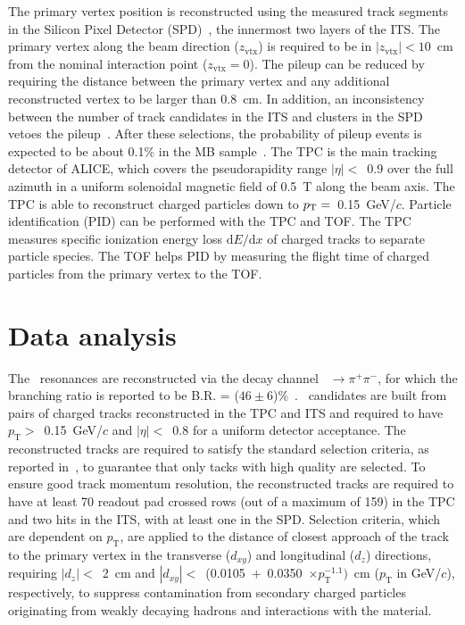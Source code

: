 The primary vertex position is reconstructed using the measured track segments in the Silicon Pixel Detector (SPD)~\cite{Santoro2009:ALICESPD}, the innermost two layers of the ITS. The primary vertex along the beam direction ($z_\mathrm{vtx}$) is required to be in $|z_\mathrm{vtx}|<10$~cm from the nominal interaction point ($z_\mathrm{vtx}=0$). The pileup can be reduced by requiring the distance between the primary vertex and any additional reconstructed vertex to be larger than 0.8~cm. In addition, an inconsistency between the number of track candidates in the ITS and clusters in the SPD vetoes the pileup~\cite{ALICE:2015olq}. After these selections, the probability of pileup events is expected to be about 0.1\% in the MB sample~\cite{ALICE:2017svf}. The TPC is the main tracking detector of ALICE, which covers the pseudorapidity range $|\eta|<$~0.9 over the full azimuth in a uniform solenoidal magnetic field of 0.5~T along the beam axis. The TPC is able to reconstruct charged particles down to $p_{\rm{T}}=$~0.15~GeV/$c$. Particle identification (PID) can be performed with the TPC and TOF. The TPC measures specific ionization energy loss $\mathrm{d}E/\mathrm{d}x$ of charged tracks to separate particle species. The TOF helps PID by measuring the flight time of charged particles from the primary vertex to the TOF.

\section{Data analysis}

The \fzero~resonances are reconstructed via the decay channel \fzero~$\rightarrow \pi^{+}\pi^{-}$, for which the branching ratio is reported to be B.R. = ($46\pm6$)\%~\cite{Stone:2013eaa}. \fzero~candidates are built from pairs of charged tracks reconstructed in the TPC and ITS and required to have $p_{\mathrm{T}}>$~0.15~GeV/$c$ and $|\eta|<$~0.8 for a uniform detector acceptance. The reconstructed tracks are required to satisfy the standard selection criteria, as reported in~\cite{ALICE:2022qnb}, to guarantee that only tacks with high quality are selected. To ensure good track momentum resolution, the reconstructed tracks are required to have at least 70 readout pad crossed rows (out of a maximum of 159) in the TPC and two hits in the ITS, with at least one in the SPD. Selection criteria, which are dependent on $p_{\mathrm{T}}$, are applied to the distance of closest approach of the track to the primary vertex in the transverse ($d_{xy}$) and longitudinal ($d_{z}$) directions, requiring $|d_{z}|<$~2~cm and $|d_{xy}|<$~(0.0105~$+$~0.0350~$\times p_{\mathrm{T}}^{-1.1})$~cm ($p_{\mathrm{T}}$ in GeV/$c$), respectively, to suppress contamination from secondary charged particles originating from weakly decaying hadrons and interactions with the material.

